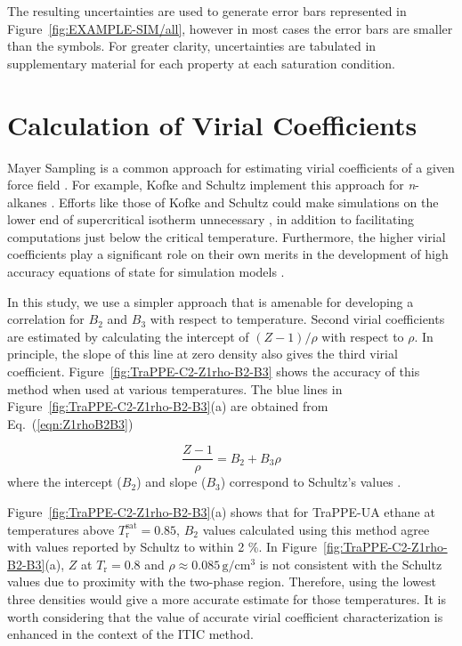 \documentclass[5p,times]{elsarticle}
\begin{document}
The resulting uncertainties are used to generate error bars represented in Figure~\ref{fig:EXAMPLE-SIM/all}, however in most cases the error bars are smaller than the symbols. For greater clarity, uncertainties are tabulated in supplementary material for each property at each saturation condition.

\section{Calculation of Virial Coefficients} \label{sec:VirialCalc}
Mayer Sampling is a common approach for estimating virial coefficients of a given force field \cite{singh2004mayer}. For example, Kofke and Schultz implement this approach for \textit{n}-alkanes \cite{Schultz2010a}. Efforts like those of Kofke and Schultz could make simulations on the lower end of supercritical isotherm unnecessary \cite{barlow2015communication}, in addition to facilitating computations just below the critical temperature.  Furthermore, the higher virial coefficients play a significant role on their own merits in the development of high accuracy equations of state for simulation models \cite{thol2016equation}.

In this study, we use a simpler approach that is amenable for developing a correlation for $B_2$ and $B_3$ with respect to temperature. Second virial coefficients are estimated by calculating the intercept of $(Z-1)/\rho$ with respect to $\rho$. In principle, the slope of this line at zero density also gives the third virial coefficient. Figure~\ref{fig:TraPPE-C2-Z1rho-B2-B3} shows the accuracy of this method when used at various temperatures. The blue lines in Figure~\ref{fig:TraPPE-C2-Z1rho-B2-B3}(a) are obtained from Eq.~(\ref{eqn:Z1rhoB2B3})

\begin{equation}
\frac{Z-1}{\rho} = B_2 + B_3\rho \label{eqn:Z1rhoB2B3}
\end{equation}
where the intercept ($B_2$) and slope ($B_3$) correspond to Schultz's values \cite{Schultz2010a}.

Figure~\ref{fig:TraPPE-C2-Z1rho-B2-B3}(a) shows that for TraPPE-UA ethane at temperatures above $T_\mathrm{r}^{\mathrm{sat}}=0.85$, $B_2$ values calculated using this method agree with values reported by Schultz to within 2 \%. In Figure~\ref{fig:TraPPE-C2-Z1rho-B2-B3}(a), $Z$ at $T_\mathrm{r} = 0.8$ and $\rho \approx 0.085\,\mathrm{g/cm^3}$ is not consistent with the Schultz values due to proximity with the two-phase region. Therefore, using the lowest three densities would give a more accurate estimate for those temperatures. It is worth considering that the value of accurate virial coefficient characterization is enhanced in the context of the ITIC method.  
\end{document}

